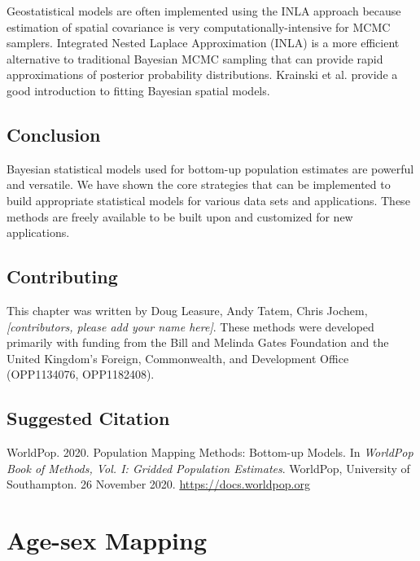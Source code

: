 \documentclass[]{book}
\begin{document}
Geostatistical models are often implemented using the INLA approach
\citep{krainski2018advanced, lindgren2015bayesian} because estimation of
spatial covariance is very computationally-intensive for MCMC samplers.
Integrated Nested Laplace Approximation (INLA) is a more efficient
alternative to traditional Bayesian MCMC sampling that can provide rapid
approximations of posterior probability distributions. Krainski et al.
\citeyearpar{krainski2018advanced} provide a good introduction to
fitting Bayesian spatial models.

\section{Conclusion}\label{conclusion-1}

Bayesian statistical models used for bottom-up population estimates are
powerful and versatile. We have shown the core strategies that can be
implemented to build appropriate statistical models for various data
sets and applications. These methods are freely available to be built
upon and customized for new applications.

\section*{Contributing}\label{contributing-2}

This chapter was written by Doug Leasure, Andy Tatem, Chris Jochem,
\emph{{[}contributors, please add your name here{]}}. These methods were
developed primarily with funding from the Bill and Melinda Gates
Foundation and the United Kingdom's Foreign, Commonwealth, and
Development Office (OPP1134076, OPP1182408).

\section*{Suggested Citation}\label{suggested-citation-2}

WorldPop. 2020. Population Mapping Methods: Bottom-up Models. In
\emph{WorldPop Book of Methods, Vol. I: Gridded Population Estimates}.
WorldPop, University of Southampton. 26 November 2020.
\url{https://docs.worldpop.org}

\hypertarget{age-sex-mapping}{\chapter{Age-sex
Mapping}\label{age-sex-mapping}}
\end{document}
